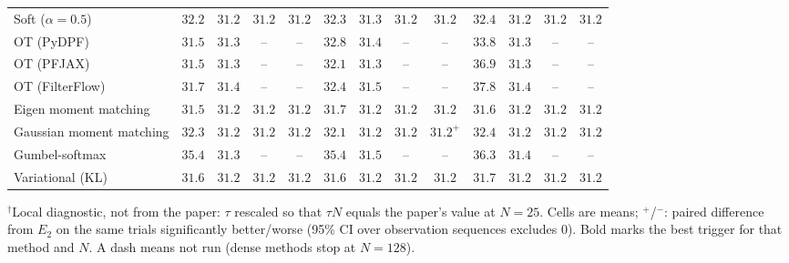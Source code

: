 \begin{table}[ht]
\begin{adjustbox}{max width=\linewidth}
\begin{tabular}{lcccc|cccc|cccc}
Soft ($\alpha{=}0.5$) & $\mathbf{32.2}$ & $31.2$ & $\mathbf{31.2}$ & $\mathbf{31.2}$ & $32.3$ & $31.3$ & $31.2$ & $\mathbf{31.2}$ & $32.4$ & $\mathbf{31.2}$ & $31.2$ & $31.2$ \\
OT (PyDPF) & $\mathbf{31.5}$ & $31.3$ & -- & -- & $32.8$ & $31.4$ & -- & -- & $33.8$ & $\mathbf{31.3}$ & -- & -- \\
OT (PFJAX) & $\mathbf{31.5}$ & $31.3$ & -- & -- & $32.1$ & $31.3$ & -- & -- & $36.9$ & $\mathbf{31.3}$ & -- & -- \\
OT (FilterFlow) & $\mathbf{31.7}$ & $31.4$ & -- & -- & $32.4$ & $31.5$ & -- & -- & $37.8$ & $\mathbf{31.4}$ & -- & -- \\
Eigen moment matching & $\mathbf{31.5}$ & $\mathbf{31.2}$ & $\mathbf{31.2}$ & $\mathbf{31.2}$ & $31.7$ & $31.2$ & $31.2$ & $\mathbf{31.2}$ & $31.6$ & $31.2$ & $31.2$ & $31.2$ \\
Gaussian moment matching & $32.3$ & $\mathbf{31.2}$ & $\mathbf{31.2}$ & $31.2$ & $\mathbf{32.1}$ & $31.2$ & $\mathbf{31.2}$ & $\mathbf{31.2}^{+}$ & $32.4$ & $31.2$ & $31.2$ & $31.2$ \\
Gumbel-softmax & $\mathbf{35.4}$ & $\mathbf{31.3}$ & -- & -- & $\mathbf{35.4}$ & $31.5$ & -- & -- & $36.3$ & $31.4$ & -- & -- \\
Variational (KL) & $\mathbf{31.6}$ & $31.2$ & $\mathbf{31.2}$ & $\mathbf{31.2}$ & $31.6$ & $\mathbf{31.2}$ & $31.2$ & $\mathbf{31.2}$ & $31.7$ & $31.2$ & $31.2$ & $31.2$ \\
\bottomrule
\end{tabular}
\end{adjustbox}
\par\smallskip\parbox{0.95\linewidth}{\footnotesize $^\dagger$Local diagnostic, not from the paper: $\tau$ rescaled so that $\tau N$ equals the paper's value at $N{=}25$. Cells are means; $^{+}$/$^{-}$: paired difference from $E_2$ on the same trials significantly better/worse (95\% CI over observation sequences excludes 0). Bold marks the best trigger for that method and $N$. A dash means not run (dense methods stop at $N{=}128$).}
\end{table}

